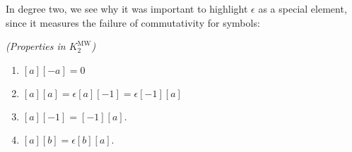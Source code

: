 \documentclass[11pt,openany]{book}
\providecommand{\MW}{\mathrm{MW}}
\begin{document}
In degree two, we see why it was important to highlight $\epsilon$ as a special element, since it measures the failure of commutativity for symbols:

\begin{proposition}\label{prop:properties-KMW2}  \textit{(Properties in $K_2^\MW$)}
\begin{enumerate}
    \item\label{KMW:bracket-times-bracket-negative}
    $[a][-a] = 0$
    \item\label{KMW:square-bracket-times-itself}
    $[a][a] = \epsilon[a][-1] = \epsilon[-1][a]$
    \item\label{KMW:bracket-a-bracket-minus-one}
    $[a][-1] = [-1][a]$.
    \item $[a][b] = \epsilon[b][a]$.
\end{enumerate}
\end{proposition}
\end{document}
